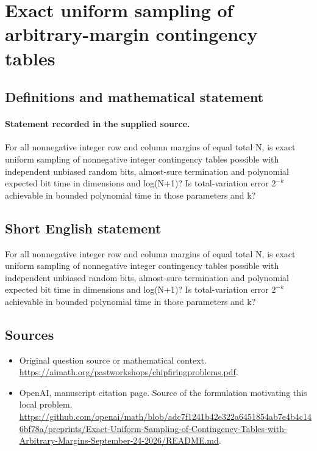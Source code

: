 \documentclass[11pt]{article}
\begin{document}
\section*{Exact uniform sampling of arbitrary-margin contingency tables}\label{30007443}
\subsection{Definitions and mathematical statement}
\paragraph{Statement recorded in the supplied source.}
For all nonnegative integer row and column margins of equal total N, is exact uniform sampling of nonnegative integer contingency tables possible with independent unbiased random bits, almost-sure termination and polynomial expected bit time in dimensions and log(N+1)? Is total-variation error $2^{-k}$ achievable in bounded polynomial time in those parameters and k?
\subsection{Short English statement}
For all nonnegative integer row and column margins of equal total N, is exact uniform sampling of nonnegative integer contingency tables possible with independent unbiased random bits, almost-sure termination and polynomial expected bit time in dimensions and log(N+1)? Is total-variation error $2^{-k}$ achievable in bounded polynomial time in those parameters and k?
\subsection{Sources}
\begin{itemize}
\item[S1] Original question source or mathematical context.
\url{https://aimath.org/pastworkshops/chipfiringproblems.pdf}.
\item[S2] OpenAI, manuscript citation page. Source of the formulation motivating this local problem.
\url{https://github.com/openai/math/blob/adc7f1241b42e322a6451854ab7e4b4c146bf78a/preprints/Exact-Uniform-Sampling-of-Contingency-Tables-with-Arbitrary-Margins-September-24-2026/README.md}.
\end{itemize}
\end{document}
